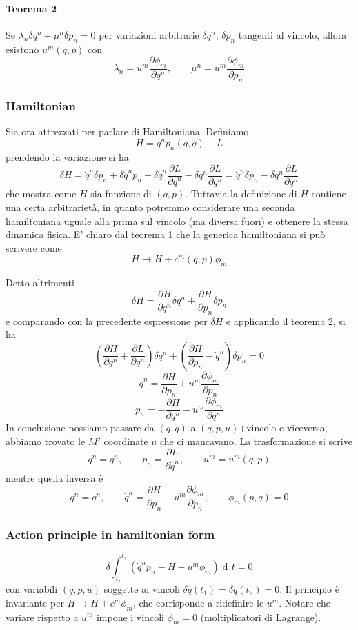 \documentclass[a4paper, 11pt]{article}
\newcommand{\dd}{\mathop{\mathrm{d}\!}{}}
\newcommand{\pderiv}[2]{\dfrac{\partial #1}{\partial #2}}
\begin{document}
	\paragraph{Teorema 2} Se $\lambda_n \delta q^n + \mu^n \delta p_n = 0$ per variazioni arbitrarie $\delta q^n$, $\delta p_n$ tangenti al vincolo, allora esistono $u^m(q,p)$ con
	\[ \lambda_n = u^m \pderiv{\phi_m}{q^n},\qquad \mu^n = u^m \pderiv{\phi_m}{p_n} \]
	
	\subsubsection{Hamiltonian}
	Sia ora attrezzati per parlare di Hamiltoniana. Definiamo
	\[ H = \dot{q}^{n}p_n (q,\dot{q}) - L \]
	prendendo la variazione si ha
	\[ \delta H = \dot{q}^{n} \delta p_n + \delta \dot{q}^{n} p_n - \delta \dot{q}^{n} \pderiv{L}{\dot{q}^{n}} - \delta q^n \pderiv{L}{q^n} = \dot{q}^{n} \delta p_n - \delta q^n \pderiv{L}{q^n} \]
	che mostra come $H$ sia funzione di $(q,p)$. Tuttavia la definizione di $H$ contiene una certa arbitrarietà, in quanto potremmo considerare una seconda hamiltoniana uguale alla prima sul vincolo (ma diversa fuori) e ottenere la stessa dinamica fisica. E' chiaro dal teorema 1 che la generica hamiltoniana si può scrivere come
	\[ H \rightarrow H + c^m(q,p) \phi_m \]
	
	Detto altrimenti
	\[ \delta H = \pderiv{H}{q^n} \delta q^n + \pderiv{H}{p_n} \delta p_n \]
	e comparando con la precedente espressione per $\delta H$ e applicando il teorema 2, si ha
	\[ \left( \pderiv{H}{q^n} + \pderiv{L}{q^n} \right) \delta q^n + \left( \pderiv{H}{p_n} - \dot{q}^{n} \right) \delta p_n = 0 \]
	\[ \dot{q}^{n} = \pderiv{H}{p_n} + u^m \pderiv{\phi_m}{p_n} \]
	\[ \dot{p}_n = -\pderiv{H}{q^n} - u^m \pderiv{\phi_m}{q^n} \]
	In conclusione possiamo passare da $(q,\dot{q})$ a $(q,p,u)$+vincolo e viceversa, abbiamo trovato le $M'$ coordinate $u$ che ci mancavano. La trasformazione si scrive
	\[ q^n = q^n, \qquad p_n = \pderiv{L}{\dot{q}^{n}},\qquad u^m = u^m(q,p) \]
	mentre quella inversa è
	\[ q^n = q^n,\qquad \dot{q}^{n} = \pderiv{H}{p_n} + u^m \pderiv{\phi_m}{p_n},\qquad \phi_m(p,q) = 0 \]
	
	\subsubsection{Action principle in hamiltonian form}
	\[ \delta \int_{t_1}^{t_2} \left( \dot{q}^{n} p_n - H - u^m \phi_m \right) \dd t = 0 \]
	con variabili $(q,p,u)$ soggette ai vincoli $\delta q(t_1) = \delta q(t_2)  = 0$. Il principio è invariante per $H\rightarrow H + c^m\phi_m$, che corrisponde a ridefinire le $u^m$. Notare che variare rispetto a $u^m$ impone i vincoli $\phi_m=0$ (moltiplicatori di Lagrange).
	
\end{document}
